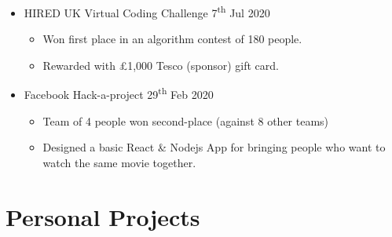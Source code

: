   \begin{itemize}
    \item HIRED \dashdiv{} UK Virtual Coding Challenge \dashdiv{} 7\textsuperscript{th} Jul 2020
    \begin{itemize}
      \item Won first place in an algorithm contest of 180 people.
      \item Rewarded with £1,000 Tesco (sponsor) gift card.
    \end{itemize}
    \item Facebook \dashdiv{} Hack-a-project \dashdiv{} 29\textsuperscript{th} Feb 2020
    \begin{itemize}
      \item Team of 4 people won second-place (against 8 other teams)
      \item Designed a basic React \& Nodejs App  for bringing people who want to watch the same movie together.
    \end{itemize}
  \end{itemize}

  \section{Personal Projects}

